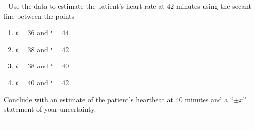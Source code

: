 \documentclass[12pt]{article}
\makeatletter
\newcounter{probcount}
\newcounter{subprobcount}
\newlength\probsep
\newlength\pshrinking
\newif\iffirstprob
\newenvironment{aproblems}%
  {\ifhmode\unskip\par\fi\setcounter{probcount}{0}\probsep\parskip
  \sbox\@tempboxa{\textbf{9.}}\pshrinking\wd\@tempboxa\advance\pshrinking\labelsep
  \let\hproblem\aproblem
  \advance\linewidth -\pshrinking
  \advance\@totalleftmargin\pshrinking
  \advance\leftskip\pshrinking}%
  {\ifhmode\unskip \par\fi\advance\leftskip-\pshrinking}%
\newcommand{\aproblem}{%
  \setcounter{subprobcount}{0}%
  \stepcounter{probcount}%
  \def\@currentlabel{\arabic{probcount}}%
  \ifhmode
    \unskip \par
  \fi
  \iffirstprob\else\addvspace\probsep\fi
  \firstprobfalse
  \hskip -\labelwidth\hskip -\labelsep 
  \hbox to\labelwidth{\hss\textbf{\arabic{probcount}.}}\hskip\labelsep
}%
\makeatother
\begin{document}
\begin{aproblems}
Use the data to estimate the patient's heart rate at $42$ minutes using the secant line between the points
\renewcommand{\labelenumi}{\alph{enumi})}
\begin{enumerate}
\item $t=36$ and $t=44$
\item $t=38$ and $t=42$
\item $t=38$ and $t=40$
\item $t=40$ and $t=42$
\end{enumerate}
Conclude with an estimate of the patient's heartbeat at 40 minutes and a ``$\pm x$'' statement of your uncertainty.
\vfill


\end{aproblems}
\end{document}
